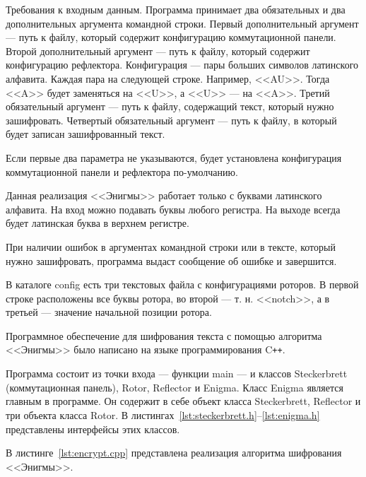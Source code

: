 \documentclass{bmstu}
\begin{document}
Требования к входным данным. 
Программа принимает два обязательных и два дополнительных аргумента командной строки. 
Первый дополнительный аргумент --- путь к файлу, который содержит конфигурацию коммутационной панели. 
Второй дополнительный аргумент --- путь к файлу, который содержит конфигурацию рефлектора. 
Конфигурация --- пары больших символов латинского алфавита. 
Каждая пара на следующей строке.  
Например, <<AU>>. 
Тогда <<A>> будет заменяться на <<U>>, а <<U>> --- на <<A>>. 
Третий обязательный аргумент --- путь к файлу, содержащий текст, который нужно зашифровать. 
Четвертый обязательный аргумент --- путь к файлу, в который будет записан зашифрованный текст.

Если первые два параметра не указываются, будет установлена конфигурация коммутационной панели и рефлектора по-умолчанию.

Данная реализация <<Энигмы>> работает только с буквами латинского алфавита. 
На вход можно подавать буквы любого регистра. 
На выходе всегда будет латинская буква в верхнем регистре.

При наличии ошибок в аргументах командной строки или в тексте, который нужно зашифровать, программа выдаст сообщение об ошибке и завершится.

В каталоге config есть три текстовых файла с конфигурациями роторов. 
В первой строке расположены все буквы ротора, во второй --- т. н. <<notch>>, а в третьей --- значение начальной позиции ротора.

Программное обеспечение для шифрования текста с помощью алгоритма <<Энигмы>> было написано на языке программирования C\texttt{+}\texttt{+}.

Программа состоит из точки входа --- функции main --- и классов Steckerbrett (коммутационная панель), Rotor, Reflector и Enigma. 
Класс Enigma является главным в программе. 
Он содержит в себе объект класса Steckerbrett, Reflector и три объекта класса Rotor. 
В листингах~\ref{lst:steckerbrett.h}--\ref{lst:enigma.h} представлены интерфейсы этих классов.





В листинге~\ref{lst:encrypt.cpp} представлена реализация алгоритма шифрования <<Энигмы>>.
\end{document}
